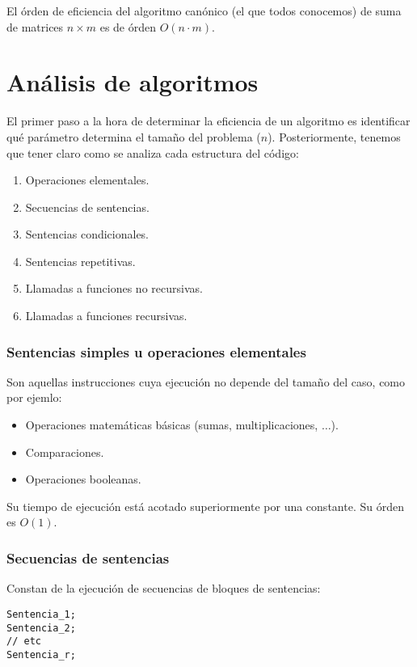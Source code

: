 \begin{ejemplo}
El órden de eficiencia del algoritmo canónico (el que todos conocemos) de suma de matrices $n\times m$ es de órden $O(n\cdot m)$.
\end{ejemplo}

\section{Análisis de algoritmos}
El primer paso a la hora de determinar la eficiencia de un algoritmo es identificar qué parámetro determina el tamaño del problema ($n$).
Posteriormente, tenemos que tener claro como se analiza cada estructura del código:
\begin{enumerate}
    \item Operaciones elementales.
    \item Secuencias de sentencias.
    \item Sentencias condicionales.
    \item Sentencias repetitivas.
    \item Llamadas a funciones no recursivas.
    \item Llamadas a funciones recursivas.
\end{enumerate}

\subsubsection{Sentencias simples u operaciones elementales}
Son aquellas instrucciones cuya ejecución no depende del tamaño del caso, como por ejemlo:
\begin{itemize}
\item Operaciones matemáticas básicas (sumas, multiplicaciones, $\ldots$).
\item Comparaciones.
\item Operaciones booleanas.
\end{itemize}

Su tiempo de ejecución está acotado superiormente por una constante. Su órden es $O(1)$.

\subsubsection{Secuencias de sentencias}
Constan de la ejecución de secuencias de bloques de sentencias:
\begin{listing}
    \begin{verbatim}
Sentencia_1;
Sentencia_2;
// etc
Sentencia_r;
    \end{verbatim}
\end{listing}


